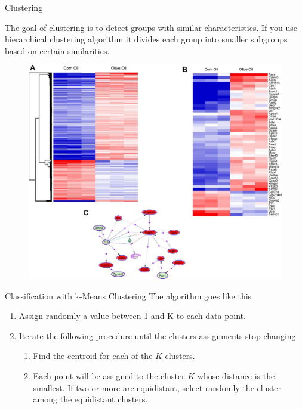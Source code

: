 \documentclass{beamer}
\begin{document}
\begin{frame}{Clustering}

	The goal of clustering is to detect groups with similar characteristics. If you use hierarchical clustering algorithm it divides each group into smaller subgroups based on certain similarities.
	\begin{figure}[h]
	\centering
	\includegraphics[scale=0.35]{Figures/clustering.jpg}
\end{figure}			
	

\end{frame}

\begin{frame}{Classification with k-Means Clustering}
	The algorithm goes like this
	
	\begin{enumerate}
		\item Assign randomly a value between 1 and K to each data point.
		\item Iterate the following procedure until the clusters assignments stop changing 
		\begin{enumerate}
			\item  Find the centroid for each of the $K$ clusters.
			\item Each point will be assigned to the cluster $K$ whose distance is the smallest. If two or more are equidistant, select randomly the cluster among the equidistant clusters.
		\end{enumerate}
	\end{enumerate}
	
\end{frame}
\end{document}
